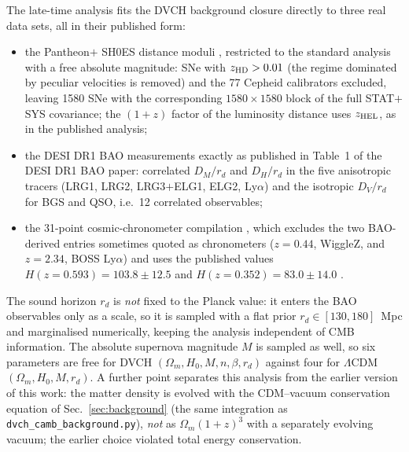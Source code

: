 \documentclass[pdflatex,sn-mathphys-num]{sn-jnl}%
\begin{document}
The late-time analysis fits the DVCH background closure directly to three
real data sets, all in their published form:
\begin{itemize}
    \item the Pantheon$+$ SH0ES distance moduli \cite{Brout2022}, restricted
    to the standard analysis with a free absolute magnitude: SNe with
    $z_{\rm HD}>0.01$ (the regime dominated by peculiar velocities is
    removed) and the 77 Cepheid calibrators excluded, leaving 1580 SNe
    with the corresponding $1580\times1580$ block of the full STAT$+$SYS
    covariance; the $(1+z)$ factor of the luminosity distance uses
    $z_{\rm HEL}$, as in the published analysis;
    \item the DESI DR1 BAO measurements \cite{Adame:2024ywp} exactly as
    published in Table~1 of the DESI DR1 BAO paper: correlated
    $D_M/r_d$ and $D_H/r_d$ in the five anisotropic tracers (LRG1, LRG2,
    LRG3$+$ELG1, ELG2, Ly$\alpha$) and the isotropic $D_V/r_d$ for BGS and
    QSO, i.e.\ 12 correlated observables;
    \item the 31-point cosmic-chronometer compilation
    \cite{Moresco:2016mzx}, which
    excludes the two BAO-derived entries sometimes quoted as chronometers
    ($z=0.44$, WiggleZ, and $z=2.34$, BOSS Ly$\alpha$) and uses the
    published values $H(z=0.593)=103.8\pm12.5$ and
    $H(z=0.352)=83.0\pm14.0$ \cite{Moresco2012}.
\end{itemize}
The sound horizon $r_d$ is \emph{not} fixed to the Planck value: it enters
the BAO observables only as a scale, so it is sampled with a flat prior
$r_d\in[130,180]$~Mpc and marginalised numerically, keeping the analysis
independent of CMB information. The absolute supernova magnitude $M$ is
sampled as well, so six parameters are free for DVCH
$(\Omega_m,H_0,M,n,\beta,r_d)$ against four for $\Lambda$CDM
$(\Omega_m,H_0,M,r_d)$. A further point separates this analysis from the
earlier version of this work: the matter density is evolved with the
CDM--vacuum conservation equation of Sec.~\ref{sec:background} (the same
integration as \texttt{dvch\_camb\_background.py}), \emph{not} as
$\Omega_m(1+z)^3$ with a separately evolving vacuum; the earlier choice
violated total energy conservation.
\end{document}
